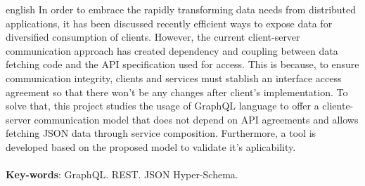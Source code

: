 \begin{resumo}[Abstract]
  \begin{otherlanguage*}{english}
  In order to embrace the rapidly transforming data needs from distributed applications, it has been discussed recently efficient ways to expose data for diversified consumption of clients. However, the current client-server communication approach has created dependency and coupling between data fetching code and the API specification used for access. This is because, to ensure communication integrity, clients and services must stablish an interface access agreement so that there won’t be any changes after client's implementation. To solve that, this project studies the usage of GraphQL language to offer a cliente-server communication model that does not depend on API agreements and allows fetching JSON data through service composition. Furthermore, a tool is developed based on the proposed model to validate it's aplicability. \\ \\
    \textbf{Key-words}: GraphQL. REST. JSON Hyper-Schema.
  \end{otherlanguage*}
\end{resumo}
